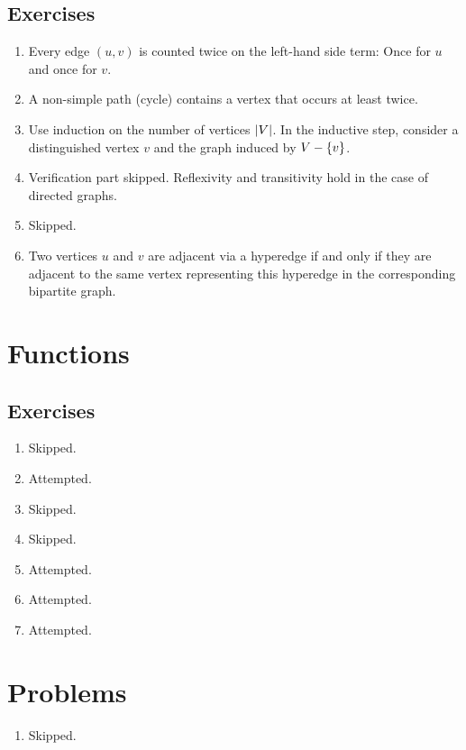 \subsection*{Exercises}
\begin{enumerate}[\thesection-1]
%
\item Every edge $(u, v)$ is counted twice on the left-hand side term: Once for $u$ and once for $v$.
%
\item A non-simple path (cycle) contains a vertex that occurs at least twice.
%
\item Use induction on the number of vertices $\left|V\right|$. In the inductive step, consider a distinguished vertex $v$ and the graph induced by $V - \left\{v\right\}$.
%
\item Verification part skipped. Reflexivity and transitivity hold in the case of directed graphs.
%
\item Skipped.
%
\item Two vertices $u$ and $v$ are adjacent via a hyperedge if and only if they are adjacent to the same vertex representing this hyperedge in the corresponding bipartite graph.
%
\end{enumerate}

\section{Functions}
\subsection*{Exercises}
\begin{enumerate}[\thesection-1]
%
\item Skipped.
%
\item Attempted.
%
\item Skipped.
%
\item Skipped.
%
\item Attempted.
%
\item Attempted.
%
\item Attempted.
%
\end{enumerate}

\section*{Problems}
\begin{enumerate}[\thechapter-1]
%
\item Skipped.
%
\end{enumerate}
